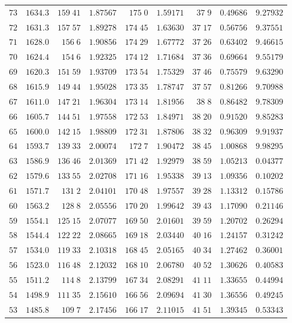 \begin{center}
\begin{tabular}{r|r|r|r|r|r|r|r|r}
$73$&$1634.3$&$159\;41$&$1.87567$&$175\;0$&$1.59171$&$37\;9$&$0.49686$&$9.27932$\\
$72$&$1631.3$&$157\;57$&$1.89278$&$174\;45$&$1.63630$&$37\;17$&$0.56756$&$9.37551$\\
$71$&$1628.0$&$156\;6$&$1.90856$&$174\;29$&$1.67772$&$37\;26$&$0.63402$&$9.46615$\\[2pt]
$70$&$1624.4$&$154\;6$&$1.92325$&$174\;12$&$1.71684$&$37\;36$&$0.69664$&$9.55179$\\
$69$&$1620.3$&$151\;59$&$1.93709$&$173\;54$&$1.75329$&$37\;46$&$0.75579$&$9.63290$\\
$68$&$1615.9$&$149\;44$&$1.95028$&$173\;35$&$1.78747$&$37\;57$&$0.81266$&$9.70988$\\
$67$&$1611.0$&$147\;21$&$1.96304$&$173\;14$&$1.81956$&$38\;8$&$0.86482$&$9.78309$\\
$66$&$1605.7$&$144\;51$&$1.97558$&$172\;53$&$1.84971$&$38\;20$&$0.91520$&$9.85283$\\[2pt]
$65$&$1600.0$&$142\;15$&$1.98809$&$172\;31$&$1.87806$&$38\;32$&$0.96309$&$9.91937$\\
$64$&$1593.7$&$139\;33$&$2.00074$&$172\;7$&$1.90472$&$38\;45$&$1.00868$&$9.98295$\\
$63$&$1586.9$&$136\;46$&$2.01369$&$171\;42$&$1.92979$&$38\;59$&$1.05213$&$0.04377$\\
$62$&$1579.6$&$133\;55$&$2.02708$&$171\;16$&$1.95338$&$39\;13$&$1.09356$&$0.10202$\\
$61$&$1571.7$&$131\;2$&$2.04101$&$170\;48$&$1.97557$&$39\;28$&$1.13312$&$0.15786$\\[2pt]
$60$&$1563.2$&$128\;8$&$2.05556$&$170\;20$&$1.99642$&$39\;43$&$1.17090$&$0.21146$\\
$59$&$1554.1$&$125\;15$&$2.07077$&$169\;50$&$2.01601$&$39\;59$&$1.20702$&$0.26294$\\
$58$&$1544.4$&$122\;22$&$2.08665$&$169\;18$&$2.03440$&$40\;16$&$1.24157$&$0.31242$\\
$57$&$1534.0$&$119\;33$&$2.10318$&$168\;45$&$2.05165$&$40\;34$&$1.27462$&$0.36001$\\
$56$&$1523.0$&$116\;48$&$2.12032$&$168\;10$&$2.06780$&$40\;52$&$1.30626$&$0.40583$\\[2pt]
$55$&$1511.2$&$114\;8$&$2.13799$&$167\;34$&$2.08291$&$41\;11$&$1.33655$&$0.44994$\\
$54$&$1498.9$&$111\;35$&$2.15610$&$166\;56$&$2.09694$&$41\;30$&$1.36556$&$0.49245$\\
$53$&$1485.8$&$109\;7$&$2.17456$&$166\;17$&$2.11015$&$41\;51$&$1.39345$&$0.53343$\\

\end{tabular}
\end{center}
